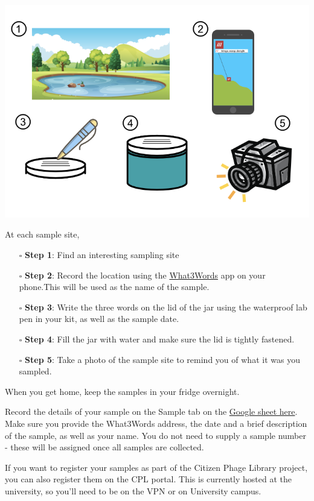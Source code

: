\documentclass[
]{book}
\providecommand{\tightlist}{%
  \setlength{\itemsep}{0pt}\setlength{\parskip}{0pt}}
\begin{document}
\includegraphics{images/sampling.png}

At each sample site,

\begin{itemize}
\tightlist
\item[$\square$]
  \textbf{Step 1}: Find an interesting sampling site
\item[$\square$]
  \textbf{Step 2}: Record the location using the \href{https://what3words.com/}{What3Words} app on your phone.This will be used as the name of the sample.
\item[$\square$]
  \textbf{Step 3}: Write the three words on the lid of the jar using the waterproof lab pen in your kit, as well as the sample date.
\item[$\square$]
  \textbf{Step 4}: Fill the jar with water and make sure the lid is tightly fastened.
\item[$\square$]
  \textbf{Step 5}: Take a photo of the sample site to remind you of what it was you sampled.
\end{itemize}

When you get home, keep the samples in your fridge overnight.

Record the details of your sample on the Sample tab on the \href{https://docs.google.com/spreadsheets/d/1V6doztAX4AQ5657eH5r0GbJj_GnfMxTe4eKh7metXl0/edit?usp=sharing}{Google sheet here}. Make sure you provide the What3Words address, the date and a brief description of the sample, as well as your name. You do not need to supply a sample number - these will be assigned once all samples are collected.

If you want to register your samples as part of the Citizen Phage Library project, you can also register them on the CPL portal. This is currently hosted at the university, so you'll need to be on the VPN or on University campus.
\end{document}
